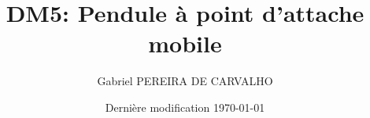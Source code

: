 \documentclass[french]{article}
\begin{document}
	\title{DM5:  Pendule à point d’attache mobile}
	\author{Gabriel PEREIRA DE CARVALHO}
	\date{Dernière modification \today}
	
	\maketitle
	
\end{document}
